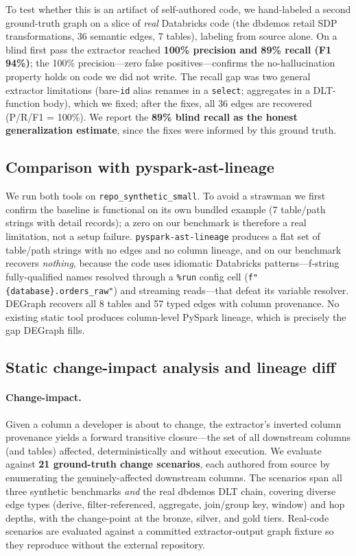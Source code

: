 \documentclass[11pt]{article}
\newcommand{\code}[1]{\texttt{#1}}
\begin{document}
To test whether this is an artifact of self-authored code, we hand-labeled a second
ground-truth graph on a slice of \emph{real} Databricks code (the dbdemos retail
SDP transformations, 36 semantic edges, 7 tables), labeling from source alone. On a
blind first pass the extractor reached \textbf{100\% precision and 89\% recall (F1
94\%)}; the 100\% precision---zero false positives---confirms the no-hallucination
property holds on code we did not write. The recall gap was two general extractor
limitations (bare-\code{id} alias renames in a \code{select}; aggregates in a
DLT-function body), which we fixed; after the fixes, all 36 edges are recovered
(P/R/F1 = 100\%). We report the \textbf{89\% blind recall as the honest
generalization estimate}, since the fixes were informed by this ground truth.

\subsection{Comparison with pyspark-ast-lineage}
\label{sec:toolcmp}
We run both tools on \code{repo_synthetic_small}. To avoid a strawman we first
confirm the baseline is functional on its own bundled example (7 table/path strings
with detail records); a zero on our benchmark is therefore a real limitation, not a
setup failure. \code{pyspark-ast-lineage} produces a flat set of table/path strings
with no edges and no column lineage, and on our benchmark recovers \emph{nothing},
because the code uses idiomatic Databricks patterns---f-string fully-qualified names
resolved through a \code{\%run} config cell (\code{f"\{database\}.\allowbreak orders_raw"}) and
streaming reads---that defeat its variable resolver. DEGraph recovers all 8 tables
and 57 typed edges with column provenance. No existing static tool produces
column-level PySpark lineage, which is precisely the gap DEGraph fills.

\subsection{Static change-impact analysis and lineage diff}
\label{sec:impact}
\paragraph{Change-impact.} Given a column a developer is about to change, the
extractor's inverted column provenance yields a forward transitive closure---the set
of all downstream columns (and tables) affected, deterministically and without
execution. We evaluate against \textbf{21 ground-truth change scenarios}, each
authored from source by enumerating the genuinely-affected downstream columns. The
scenarios span all three synthetic benchmarks \emph{and} the real dbdemos DLT chain,
covering diverse edge types (derive, filter-referenced, aggregate, join/group key,
window) and hop depths, with the change-point at the bronze, silver, and gold tiers.
Real-code scenarios are evaluated against a committed extractor-output graph fixture
so they reproduce without the external repository.
\end{document}
